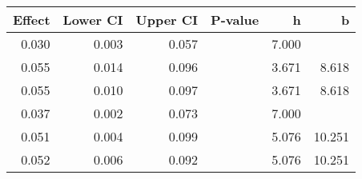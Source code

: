 \begin{table}[ht]
\centering
\begin{tabular}{rrrrrr}
  \hline
Effect & Lower CI & Upper CI & P-value & h & b \\ 
  \hline
0.030 & 0.003 & 0.057 &  & 7.000 &  \\ 
  0.055 & 0.014 & 0.096 &  & 3.671 & 8.618 \\ 
  0.055 & 0.010 & 0.097 &  & 3.671 & 8.618 \\ 
  0.037 & 0.002 & 0.073 &  & 7.000 &  \\ 
  0.051 & 0.004 & 0.099 &  & 5.076 & 10.251 \\ 
  0.052 & 0.006 & 0.092 &  & 5.076 & 10.251 \\ 
   \hline
\end{tabular}
\end{table}
